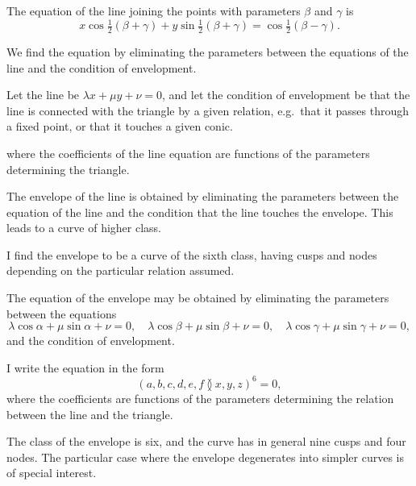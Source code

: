 \documentclass[11pt,a4paper]{article}
\theoremstyle{plain}
\begin{document}
The equation of the line joining the points with parameters $\beta$ and $\gamma$ is
\begin{equation}
x\cos\tfrac{1}{2}(\beta+\gamma) + y\sin\tfrac{1}{2}(\beta+\gamma) = \cos\tfrac{1}{2}(\beta-\gamma).
\end{equation}

\newpage
\setcounter{equation}{1}

We find the equation by eliminating the parameters between the equations of the line and the condition of envelopment.

Let the line be $\lambda x + \mu y + \nu = 0$, and let the condition of envelopment be that the line is connected with the triangle by a given relation, e.g.~that it passes through a fixed point, or that it touches a given conic.

\newpage
\setcounter{equation}{1}

where the coefficients of the line equation are functions of the parameters determining the triangle.

The envelope of the line is obtained by eliminating the parameters between the equation of the line and the condition that the line touches the envelope. This leads to a curve of higher class.

\newpage
\setcounter{equation}{1}

I find the envelope to be a curve of the sixth class, having cusps and nodes depending on the particular relation assumed.

The equation of the envelope may be obtained by eliminating the parameters between the equations
\begin{equation}
\lambda\cos\alpha + \mu\sin\alpha + \nu = 0, \quad \lambda\cos\beta + \mu\sin\beta + \nu = 0, \quad \lambda\cos\gamma + \mu\sin\gamma + \nu = 0,
\end{equation}
and the condition of envelopment.

\newpage
\setcounter{equation}{2}

I write the equation in the form
\begin{equation}
(a, b, c, d, e, f \between x, y, z)^6 = 0,
\end{equation}
where the coefficients are functions of the parameters determining the relation between the line and the triangle.

The class of the envelope is six, and the curve has in general nine cusps and four nodes. The particular case where the envelope degenerates into simpler curves is of special interest.
\end{document}
